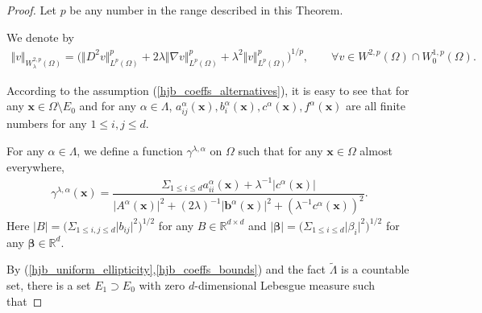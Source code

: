 \documentclass[12pt]{amsart}
\newcommand{\boldx}{\boldsymbol{x}}
\theoremstyle{definition}
\theoremstyle{remark}
\begin{document}
\begin{proof}
Let $p$ be any number in the range described in this Theorem.

We denote by 
\begin{align*}
\Vert v\Vert_{W_{\lambda}^{2,p}(\Omega)}= 
\big( \Vert D^{2}v\Vert_{L^{p}(\Omega)}^{p} 
+ 2\lambda\Vert \nabla v\Vert_{L^{p}(\Omega)}^{p} 
+ \lambda^{2}\Vert v\Vert_{L^{p}(\Omega)}^{p} \big)^{1/p}, 
\qquad \forall v \in W^{2,p}(\Omega)\cap W_{0}^{1,p}(\Omega).
\end{align*}

According to the assumption (\ref{hjb_coeffs_alternatives}), it is easy to see 
that for any $\boldx \in \Omega \setminus E_{0}$ and for any $\alpha\in\Lambda$, 
$a_{ij}^{\alpha}(\boldx),b_{i}^{\alpha}(\boldx),c^{\alpha}(\boldx), 
f^{\alpha}(\boldx)$ are all finite numbers for any $1\leq i,j \leq d$. 

For any $\alpha \in \Lambda$, we define a function $\gamma^{\lambda, \alpha}$ 
on $\Omega$ such that for any $\boldx\in\Omega$ almost everywhere,
\begin{align}
\label{def_gamma_lambda_alpha}
\gamma^{\lambda,\alpha}(\boldx) 
= \dfrac{\Sigma_{1\leq i \leq d}a_{ii}^{\alpha}
(\boldx)+ \lambda^{-1}\vert c^{\alpha}(\boldx)\vert}{\vert A^{\alpha}(\boldx)
\vert^{2} + (2\lambda)^{-1}\vert \boldsymbol{b}^{\alpha}(\boldx)\vert^{2} 
+ (\lambda^{-1}c^{\alpha}(\boldx))^{2}}. 
\end{align}
Here $\vert B\vert = \big(\Sigma_{1\leq i,j \leq d}\vert b_{ij} \vert^{2}
\big)^{1/2}$ for any $B \in \mathbb{R}^{d\times d}$ and 
$\vert \boldsymbol{\beta} \vert = \big(\Sigma_{1\leq i \leq d}  
\vert \beta_{i}\vert^{2} \big)^{1/2}$ for any $\boldsymbol{\beta}
\in \mathbb{R}^{d}$.


By (\ref{hjb_uniform_ellipticity},\ref{hjb_coeffs_bounds}) and the fact 
$\tilde{\Lambda}$ is a countable set, there is a set $E_{1}
\supset E_{0}$ with zero $d$-dimensional Lebesgue measure such that   


\end{proof}
\end{document}
